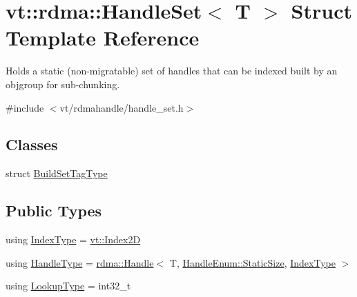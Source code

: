 \hypertarget{structvt_1_1rdma_1_1_handle_set}{}\section{vt\+:\+:rdma\+:\+:Handle\+Set$<$ T $>$ Struct Template Reference}
\label{structvt_1_1rdma_1_1_handle_set}


Holds a static (non-\/migratable) set of handles that can be indexed built by an objgroup for sub-\/chunking.  




{\ttfamily \#include $<$vt/rdmahandle/handle\+\_\+set.\+h$>$}

\subsection*{Classes}
\begin{DoxyCompactItemize}
\item 
struct \hyperlink{structvt_1_1rdma_1_1_handle_set_1_1_build_set_tag_type}{Build\+Set\+Tag\+Type}
\end{DoxyCompactItemize}
\subsection*{Public Types}
\begin{DoxyCompactItemize}
\item 
using \hyperlink{structvt_1_1rdma_1_1_handle_set_aa0dbb6a47c459fb4290f0ca96e573097}{Index\+Type} = \hyperlink{namespacevt_a3bab786053b74a3d856fff1412ffa73a}{vt\+::\+Index2D}
\item 
using \hyperlink{structvt_1_1rdma_1_1_handle_set_ab3a698ee86bae503dfa84617205b2dd9}{Handle\+Type} = \hyperlink{structvt_1_1rdma_1_1_handle}{rdma\+::\+Handle}$<$ T, \hyperlink{namespacevt_1_1rdma_a0234ff19cfb3c04718cfdfd36b2d6d88a0c5c41d6a0319a61d3a5e8a060b7c4d7}{Handle\+Enum\+::\+Static\+Size}, \hyperlink{structvt_1_1rdma_1_1_handle_set_aa0dbb6a47c459fb4290f0ca96e573097}{Index\+Type} $>$
\item 
using \hyperlink{structvt_1_1rdma_1_1_handle_set_a81d333ec397f0becb9fe692e53145441}{Lookup\+Type} = int32\+\_\+t
\end{DoxyCompactItemize}
